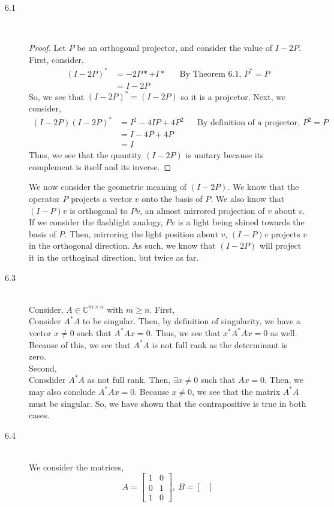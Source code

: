 \documentclass[letterpaper,10pt]{article}
\newcommand{\C}{\mathbb{C}}
\begin{document}
\begin{description}
\item[6.1]\hfill \\
\begin{proof}
Let $P$ be an orthogonal projector, and consider the value of $I-2P$. First, consider,
\begin{align*}
(I-2P)^*&=-2P*+I* && \text{By Theorem 6.1, } P^*=P\\
&=I-2P
\end{align*}
So, we see that $(I-2P)^*=(I-2P)$ so it is a projector. Next, we consider,
\begin{align*}
(I-2P)(I-2P)^*&=I^2-4IP+4P^2 && \text{By definition of a projector, } P^2=P\\
&=I-4P+4P\\
&=I
\end{align*}
Thus, we see that the quantity $(I-2P)$ is unitary because its complement is itself and its inverse.
\end{proof}
We now consider the geometric meaning of $(I-2P)$. We know that the operator $P$ projects a vector $v$ onto the basis of $P$. We also know that $(I-P)v$ is orthogonal to $Pv$, an almost mirrored projection of $v$ about $v$. If we consider the flashlight analogy, $Pv$ is a light being shined towards the basis of $P$. Then, mirroring the light position about $v$, $(I-P)v$ projects $v$ in the orthogonal direction. As such, we know that $(I-2P)$ will project it in the orthoginal direction, but twice as far.
\item[6.3]\hfill \\
Consider, $A\in \C^{m\times n}$ with $m\geq n$. First,\\
Consider $A^*A$ to be singular. Then, by definition of singularity, we have a vector $x\neq 0$ such that $A^*Ax=0$. Thus, we see that $x^*A^*Ax=0$ as well. Because of this, we see that $A^*A$ is not full rank as the determinant is zero.\\
Second,\\
Consdider $A^*A$ as not full rank. Then, $\exists x\neq 0$ such that $Ax=0$. Then, we may also conclude $A^*Ax=0$. Because $x\neq 0$, we see that the matrix $A^*A$ must be singular. So, we have shown that the contrapositive is true in both cases.
\item[6.4]\hfill \\
We consider the matrices,
\[A=\begin{bmatrix}
1 & 0\\0 & 1\\1 & 0
\end{bmatrix},\ B=\begin{bmatrix}

\end{bmatrix}\]
\end{description}
\end{document}
